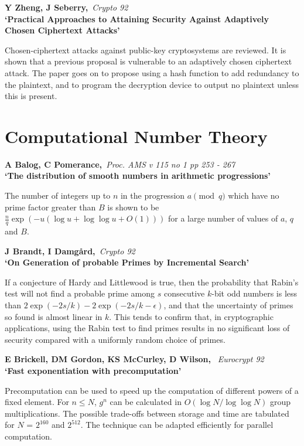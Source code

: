 {\bf \noindent Y Zheng, J Seberry,}{\em ~Crypto 92\\}
{\bf `Practical Approaches to Attaining Security Against Adaptively Chosen
Ciphertext Attacks'}

Chosen-ciphertext attacks against public-key cryptosystems are reviewed. 
It is shown that a previous proposal is vulnerable to an adaptively chosen 
ciphertext attack. The paper goes on to propose using a hash function to add 
redundancy to the plaintext, and to program the decryption device to output 
no plaintext unless this is present.




\pagebreak

\normalsize
\section{Computational Number Theory}
\small

{\bf \noindent A Balog, C Pomerance,}{\em ~Proc. AMS v 115 no 1 pp 253 -
267\\}
{\bf `The distribution of smooth numbers in arithmetic progressions'}

The number of integers up to $n$ in the progression $a \pmod{q}$ which
have no prime factor greater than $B$ is shown to be $\frac{n}{q} 
\exp{(-u(\log{u}+\log{\log{u}}+O(1)))}$ for a large number of values of
$a$, $q$ and $B$.

{\bf \noindent J Brandt, I Damg\aa rd,}{\em ~Crypto 92\\}
{\bf `On Generation of probable Primes by Incremental Search'}

If a conjecture of Hardy and Littlewood is true, then the probability that
Rabin's test will not find a probable prime among $s$ consecutive $k$-bit 
odd numbers is less than $2\exp (-2s/k)-2\exp (-2s/k - \epsilon)$, and that
the uncertainty of primes so found is almost linear in $k$. This tends to
confirm that, in cryptographic applications, using the Rabin test to find 
primes results in no significant loss of security compared with a uniformly 
random choice of primes.

{\bf \noindent E Brickell, DM Gordon, KS McCurley, D Wilson,}
{\em ~Eurocrypt 92\\}
{\bf `Fast exponentiation with precomputation'}

Precomputation can be used to speed up the computation of different
powers of a fixed element. For $n \leq N$, $g^n$ can be calculated in
$O(\log N/\log \log N)$ group multiplications. The possible trade-offs
between storage and time are tabulated for $N$ = $2^{160}$ and $2^{512}$.
The technique can be adapted efficiently for parallel computation.

